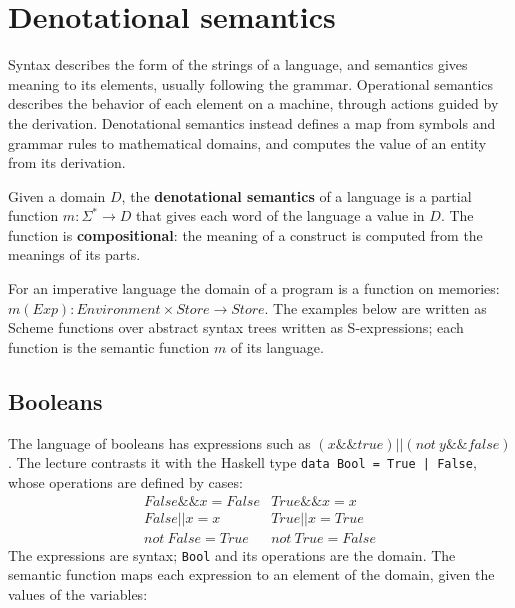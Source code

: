 \section{Denotational semantics}
\label{sec:denotational}

Syntax describes the form of the strings of a language, and semantics gives
meaning to its elements, usually following the grammar. Operational
semantics describes the behavior of each element on a machine, through
actions guided by the derivation. Denotational semantics instead defines a
map from symbols and grammar rules to mathematical domains, and computes the
value of an entity from its derivation.

\begin{definition}
Given a domain $D$, the \textbf{denotational semantics} of a language is a
partial function $m : \Sigma^* \to D$ that gives each word of the language a
value in $D$. The function is \textbf{compositional}: the meaning of a
construct is computed from the meanings of its parts.
\end{definition}

For an imperative language the domain of a program is a function on
memories: $m(\mathit{Exp}) : \mathit{Environment} \times \mathit{Store} \to \mathit{Store}$. The
examples below are written as Scheme functions over abstract syntax trees
written as S-expressions; each function is the semantic function $m$ of its
language.

\subsection{Booleans}

The language of booleans has expressions such as
$(x \mathbin{\&\&} \mathit{true}) \mathbin{||} (\mathit{not}\ y \mathbin{\&\&} \mathit{false})$.
The lecture contrasts it with the Haskell type \texttt{data Bool = True | False},
whose operations are defined by cases:
\[
\begin{array}{ll}
\mathit{False} \mathbin{\&\&} x = \mathit{False} & \mathit{True} \mathbin{\&\&} x = x \\
\mathit{False} \mathbin{||} x = x & \mathit{True} \mathbin{||} x = \mathit{True} \\
\mathit{not}\ \mathit{False} = \mathit{True} & \mathit{not}\ \mathit{True} = \mathit{False}
\end{array}
\]
The expressions are syntax; \texttt{Bool} and its operations are the domain.
The semantic function maps each expression to an element of the domain,
given the values of the variables:

